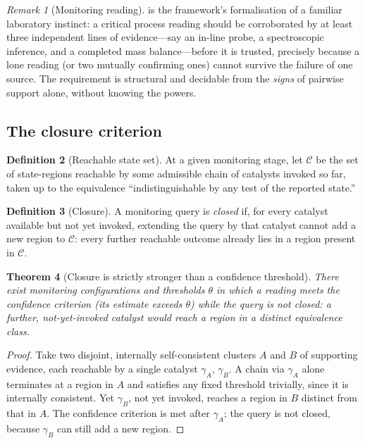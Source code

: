 \documentclass[11pt,twocolumn,a4paper]{article}
\theoremstyle{thmstyle}
\newtheorem{theorem}{Theorem}[section]
\theoremstyle{definition}
\newtheorem{definition}[theorem]{Definition}
\theoremstyle{remark}
\newtheorem{remark}[theorem]{Remark}
\begin{document}
\begin{remark}[Monitoring reading]
\label{rem:triangle-monitoring}
 is the framework's formalisation of a familiar
laboratory instinct: a critical process reading should be corroborated by
at least three independent lines of evidence---say an in-line probe, a
spectroscopic inference, and a completed mass balance---before it is
trusted, precisely because a lone reading (or two mutually confirming ones)
cannot survive the failure of one source. The requirement is structural and
decidable from the \emph{signs} of pairwise support alone, without knowing
the powers.
\end{remark}

\subsection{The closure criterion}

\begin{definition}[Reachable state set]
\label{def:reachable}
At a given monitoring stage, let $\mathcal{C}$ be the set of state-regions
reachable by some admissible chain of catalysts invoked so far, taken up to
the equivalence ``indistinguishable by any test of the reported state.''
\end{definition}

\begin{definition}[Closure]
\label{def:closure}
A monitoring query is \emph{closed} if, for every catalyst available but
not yet invoked, extending the query by that catalyst cannot add a new
region to $\mathcal{C}$: every further reachable outcome already lies in a
region present in $\mathcal{C}$.
\end{definition}

\begin{theorem}[Closure is strictly stronger than a confidence threshold]
\label{thm:closure-stronger}
There exist monitoring configurations and thresholds $\theta$ in which a
reading meets the confidence criterion (its estimate exceeds $\theta$)
while the query is not closed: a further, not-yet-invoked catalyst would
reach a region in a distinct equivalence class.
\end{theorem}

\begin{proof}
Take two disjoint, internally self-consistent clusters $A$ and $B$ of
supporting evidence, each reachable by a single catalyst $\gamma_A$,
$\gamma_B$. A chain via $\gamma_A$ alone terminates at a region in $A$ and
satisfies any fixed threshold trivially, since it is internally consistent.
Yet $\gamma_B$, not yet invoked, reaches a region in $B$ distinct from that
in $A$. The confidence criterion is met after $\gamma_A$; the query is not
closed, because $\gamma_B$ can still add a new region.
\end{proof}
\end{document}
